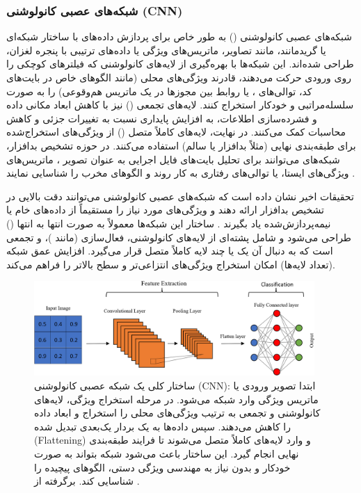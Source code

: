 \subsubsection{شبکه‌های عصبی کانولوشنی (CNN)}
شبکه‌های عصبی کانولوشنی () به طور خاص برای پردازش داده‌های با ساختار شبکه‌ای یا گریدمانند، مانند تصاویر، ماتریس‌های ویژگی یا داده‌های ترتیبی با پنجره لغزان، طراحی شده‌اند. این شبکه‌ها با بهره‌گیری از لایه‌های کانولوشنی که فیلترهای کوچکی را روی ورودی حرکت می‌دهند، قادرند ویژگی‌های محلی (مانند الگوهای خاص در بایت‌های کد، توالی‌های ، یا روابط بین مجوزها در یک ماتریس هم‌وقوعی) را به صورت سلسله‌مراتبی و خودکار استخراج کنند. لایه‌های تجمعی () نیز با کاهش ابعاد مکانی داده و فشرده‌سازی اطلاعات، به افزایش پایداری نسبت به تغییرات جزئی و کاهش محاسبات کمک می‌کنند. در نهایت، لایه‌های کاملاً متصل () از ویژگی‌های استخراج‌شده برای طبقه‌بندی نهایی (مثلاً بدافزار یا سالم) استفاده می‌کنند. در حوزه تشخیص بدافزار، شبکه‌های  می‌توانند برای تحلیل بایت‌های فایل اجرایی به عنوان تصویر \cite{Nataraj2011}، ماتریس‌های ویژگی‌های ایستا، یا توالی‌های رفتاری به کار روند و الگوهای مخرب را شناسایی نمایند \cite{Vinayakumar2019}.

تحقیقات اخیر نشان داده است که شبکه‌های عصبی کانولوشنی می‌توانند دقت بالایی در تشخیص بدافزار ارائه دهند و ویژگی‌های مورد نیاز را مستقیماً از داده‌های خام یا نیمه‌پردازش‌شده یاد بگیرند \cite{Alsaleh2023}. ساختار این شبکه‌ها معمولاً به صورت انتها به انتها () طراحی می‌شود و شامل پشته‌ای از لایه‌های کانولوشنی، فعال‌سازی (مانند )، و تجمعی است که به دنبال آن یک یا چند لایه کاملاً متصل قرار می‌گیرد. افزایش عمق شبکه (تعداد لایه‌ها) امکان استخراج ویژگی‌های انتزاعی‌تر و سطح بالاتر را فراهم می‌کند.

\begin{figure}[!t]
    \centering
    \includegraphics[width=0.95\textwidth]{images/cnn_structure}
    \caption{ساختار کلی یک شبکه عصبی کانولوشنی (CNN): ابتدا تصویر ورودی یا ماتریس ویژگی وارد شبکه می‌شود. در مرحله استخراج ویژگی، لایه‌های کانولوشنی و تجمعی به ترتیب ویژگی‌های محلی را استخراج و ابعاد داده را کاهش می‌دهند. سپس داده‌ها به یک بردار یک‌بعدی تبدیل شده (Flattening) و وارد لایه‌های کاملاً متصل می‌شوند تا فرایند طبقه‌بندی نهایی انجام گیرد. این ساختار باعث می‌شود شبکه بتواند به صورت خودکار و بدون نیاز به مهندسی ویژگی دستی، الگوهای پیچیده را شناسایی کند. برگرفته از \cite{Alsaleh2023}.}
    \label{fig:cnn_structure}
\end{figure}

